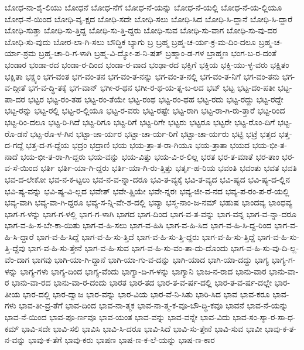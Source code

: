 {ಬೋಧ-ನಾ-ಶೈ-ಲಿಯು
ಬೋಧನೆ
ಬೋಧ-ನೆಗೆ
ಬೋಧ-ನೆ-ಯನ್ನು
ಬೋಧ-ನೆ-ಯಲ್ಲಿ
ಬೋಧ-ನೆ-ಯ-ಲ್ಲಿಯೂ
ಬೋಧ-ನೆ-ಯಿಂದ
ಬೋಧಿ-ವೃ-ಕ್ಷದ
ಬೋಧಿ-ಸದೇ
ಬೋಧಿ-ಸಲು
ಬೋಧಿ-ಸಿದ
ಬೋಧಿ-ಸಿ-ದ್ದಾನೆ
ಬೋಧಿ-ಸಿ-ದ್ದಾರೆ
ಬೋಧಿ-ಸುತ್ತಾ
ಬೋಧಿ-ಸು-ತ್ತಿದ್ದ
ಬೋಧಿ-ಸು-ತ್ತಿ-ದ್ದರು
ಬೋಧಿ-ಸುವ
ಬೋಧಿ-ಸು-ವಾಗ
ಬೋಧಿ-ಸು-ವು-ದರ
ಬೋಧಿ-ಸು-ವುದು
ಬೋರ-ಲಾ-ಗಿ-ಸಲು
ಬೌದ್ಧಿಕ
ಬ್ಯಾಗು
ಬ್ರ
ಬ್ರಹ್ಮ
ಬ್ರಹ್ಮ-ಚ-ರ್ಯ-ಕ್ರ-ಮ-ದಿಂ-ದಲೂ
ಬ್ರಹ್ಮ-ಚ-ರ್ಯಾ-ಶ್ರಮ
ಬ್ರಹ್ಮ-ಚಾ-ರಿ-ಗ-ಳಾಗಿ
ಬ್ರಹ್ಮ-ವಿ-ದ್ಯೋ-ಪ-ನಿ-ಷತ್
ಬ್ರಹ್ಮಾಂ-ಡ-ಗಳ
ಬ್ರಾಹ್ಮಣ
ಭಂಗ-ಬ-ರ-ದಂತೆ
ಭಂಡಾರ
ಭಂಡಾ-ರದ
ಭಂಡಾ-ರ-ದಿಂದ
ಭಂಡಾ-ರ-ವಾದ
ಭಂಢಾ-ರದ
ಭಕ್ತಿಗೆ
ಭಕ್ತಿಯ
ಭಕ್ತಿ-ಯು-ಳ್ಳ-ವರು
ಭಕ್ಷಿತಂ
ಭಕ್ಷಿತಾ
ಭಕ್ಷ್ಯಂ
ಭಗ-ವಂತ
ಭಗ-ವಂ-ತನ
ಭಗ-ವಂ-ತ-ನನ್ನು
ಭಗ-ವಂ-ತ-ನಲ್ಲಿ
ಭಗ-ವಂ-ತ-ನಿಗೆ
ಭಗ-ವಂ-ತನು
ಭಗ-ವ-ದ್ಗೀತೆ
ಭಗ-ವ-ದ್ಧಿ-ತಕ್ಕೆ
ಭಗ-ವಾನ್
ಭಗೀ-ರ-ಥನ
ಭಗೀ-ರ-ಥ-ಯ-ತ್ನ-ಬ-ಲದ
ಭಟ್
ಭಟ್ಟ
ಭಟ್ಟ-ದಂ-ಪತೀ
ಭಟ್ಟ-ಪಾ-ದರ
ಭಟ್ಟರ
ಭಟ್ಟ-ರಂ-ತಹ
ಭಟ್ಟ-ರಂ-ತೆಯೇ
ಭಟ್ಟ-ರಂಥ
ಭಟ್ಟ-ರಂ-ಥಹ
ಭಟ್ಟ-ರದು
ಭಟ್ಟ-ರದ್ದು
ಭಟ್ಟ-ರದ್ದೇ
ಭಟ್ಟ-ರನ್ನು
ಭಟ್ಟ-ರಲ್ಲಿ
ಭಟ್ಟ-ರ-ಲ್ಲಿಯೂ
ಭಟ್ಟ-ರ-ವರು
ಭಟ್ಟ-ರಷ್ಟೇ
ಭಟ್ಟ-ರಾಗಿ
ಭಟ್ಟ-ರಾ-ಗಿ-ರು-ತ್ತಾರೆ
ಭಟ್ಟ-ರಿಂದ
ಭಟ್ಟ-ರಿಂ-ದಲೂ
ಭಟ್ಟ-ರಿ-ಗಿದೆ
ಭಟ್ಟ-ರಿಗೂ
ಭಟ್ಟ-ರಿಗೆ
ಭಟ್ಟ-ರಿಗೇ
ಭಟ್ಟರು
ಭಟ್ಟರೂ
ಭಟ್ಟರೇ
ಭಟ್ಟ-ರೊಂ-ದಿಗೆ
ಭಟ್ಟ-ರೊ-ಡನೆ
ಭಟ್ಟ-ರೊ-ಳ-ಗಿನ
ಭಟ್ಟಾ-ಚಾ-ರ್ಯರ
ಭಟ್ಟಾ-ಚಾ-ರ್ಯ-ರಿಗೆ
ಭಟ್ಟಾ-ಚಾ-ರ್ಯರು
ಭಟ್ಟಿ
ಭಟ್ರೆ
ಭತ್ತದ
ಭತ್ತ-ದ-ಗದ್ದೆ
ಭತ್ತ-ದ-ಗ-ದ್ದೆಯ
ಭದ್ರಂ
ಭದ್ರಾಣಿ
ಭಯ
ಭಯ-ತ್ರಾ-ತ-ರಾ-ಗಿಯೂ
ಭಯ-ತ್ರಾತಾ
ಭಯದ
ಭಯ-ಭೀ-ತ-ನಾದೆ
ಭಯ-ಭೀ-ತ-ರಾ-ಗಿ-ದ್ದರು
ಭಯ-ವನ್ನು
ಭಯ-ವಿತ್ತು
ಭಯ-ವಿ-ರ-ಲಿಲ್ಲ
ಭರತ
ಭರ-ತ-ಮಾತೆ
ಭರ-ತಾಂ
ಭರ-ವ-ಸೆ-ಯಿಂದ
ಭರ್ತಿ
ಭರ್ತಿ-ಯಾ-ಗಿ-ದ್ದರು
ಭರ್ತಿ-ಯಾ-ಗಿ-ರು-ತ್ತಿತ್ತು
ಭರ್ತೃ-ಹ-ರಿಯ
ಭವಂತಿ
ಭವಂತು
ಭವತ
ಭವತಿ
ಭವ-ದ-ಲೇಕೋ
ಭವ-ನ-ಕ-ಟ್ಟಲು
ಭವ-ನ-ವ-ನ್ನಾ-ದರೂ
ಭವಿ-ತ-ವ್ಯಕ್ಕೆ
ಭವಿ-ತ-ವ್ಯದ
ಭವಿ-ಷ್ಯದ
ಭವಿ-ಷ್ಯ-ದ-ಲ್ಲಿನ
ಭವಿ-ಷ್ಯ-ವನ್ನು
ಭವಿ-ಷ್ಯ-ವಿ-ಲ್ಲದ
ಭವೇತ್
ಭವೇ-ತ್ಪ್ರಿಯೇ
ಭವೇ-ನ್ನರಃ
ಭವ್ಯ-ಜೀ-ವ-ನದ
ಭವ್ಯ-ಪ-ರಂ-ಪ-ರೆ-ಯಲ್ಲಿ
ಭವ್ಯ-ವಾಗಿ
ಭವ್ಯ-ವಾ-ಗಿ-ದ್ದರೂ
ಭವ್ಯ-ಸ-ನ್ನಿ-ವೇ-ಶ-ದಲ್ಲಿ
ಭವ್ಯಾ
ಭಸ್ಮ-ನಾಂ-ಜ-ನಮ್
ಭಹುಷ
ಭಾಂದವ್ಯ
ಭಾಂಧವ್ಯ
ಭಾಗ-ಗ-ಳನ್ನು
ಭಾಗ-ಗ-ಳಲ್ಲಿ
ಭಾಗ-ಗ-ಳಾಗಿ
ಭಾಗದ
ಭಾಗ-ದಿಂದ
ಭಾಗ-ವ-ತ-ವನ್ನು
ಭಾಗ-ವನ್ನ
ಭಾಗ-ವ-ನ್ನಾ-ದರೂ
ಭಾಗ-ವ-ಹಿ-ಸ-ಬೇ-ಕಾ-ಯಿತು
ಭಾಗ-ವ-ಹಿ-ಸಲು
ಭಾಗ-ವ-ಹಿಸಿ
ಭಾಗ-ವ-ಹಿ-ಸಿದ
ಭಾಗ-ವ-ಹಿ-ಸಿ-ದ್ದ-ರಿಂದ
ಭಾಗ-ವ-ಹಿ-ಸಿ-ದ್ದಾರೆ
ಭಾಗ-ವ-ಹಿ-ಸಿದ್ದೆ
ಭಾಗ-ವ-ಹಿ-ಸು-ತ್ತಿದೆ
ಭಾಗ-ವ-ಹಿ-ಸು-ತ್ತಿ-ದ್ದರು
ಭಾಗ-ವ-ಹಿ-ಸು-ತ್ತಿದ್ದೆ
ಭಾಗ-ವ-ಹಿ-ಸು-ತ್ತಿ-ದ್ದೆವು
ಭಾಗ-ವ-ಹಿ-ಸು-ತ್ತೇನೆ
ಭಾಗ-ವ-ಹಿ-ಸುವ
ಭಾಗ-ವ-ಹಿ-ಸು-ವಂ-ತಾ-ದು-ದೊಂದು
ಭಾಗ-ವ-ಹಿ-ಸು-ವು-ದಿ-ಲ್ಲ-ವೆಂ-ದಾಗ
ಭಾಗವು
ಭಾಗಿ-ಯಾ-ಗಿ-ದ್ದಾನೆ
ಭಾಗಿ-ಯಾ-ಗು-ವ-ದನ್ನು
ಭಾಗಿ-ಯಾದ
ಭಾಗಿ-ಯಾ-ದದ್ದು
ಭಾಗ್ಯ
ಭಾಗ್ಯ-ಗ-ಳನ್ನು
ಭಾಗ್ಯ-ಗಳು
ಭಾಗ್ಯ-ದಿಂದ
ಭಾಗ್ಯ-ವೆಂದು
ಭಾಗ್ಯಾ-ದಿ-ಗ-ಳನ್ನು
ಭಾಗ್ಯಾನಿ
ಭಾಜ-ನ-ರಾದ
ಭಾನು-ವಾರ
ಭಾನು-ವಾ-ರ				
ಭಾನು-ವಾ-ರದ
ಭಾನು-ವಾ-ರ-ದಂದು
ಭಾರತ
ಭಾರ-ತದ
ಭಾರ-ತ-ವ-ರ್ಷ-ದಲ್ಲಿ
ಭಾರ-ತ-ವ-ರ್ಷ-ದಲ್ಲೇ
ಭಾರ-ತೀಯ
ಭಾರ-ದಲ್ಲಿ
ಭಾರ-ದ್ವಾಜ
ಭಾರ-ವನ್ನು
ಭಾರ-ವಿಯ
ಭಾರ-ವೆ-ನಿ-ಸಿತು
ಭಾರಿ-ಸಿದ
ಭಾವ
ಭಾವ-ಕರೂ
ಭಾವ-ಗಳು
ಭಾವ-ತೀ-ವ್ರ-ತೆಗೆ
ಭಾವ-ದಿಂದ
ಭಾವ-ನಾ-ತ್ಮಕ
ಭಾವ-ನಾ-ತ್ಮ-ಕ-ವೂ-ಬೌ-ದ್ಧಿ-ಕವೂ
ಭಾವನೆ
ಭಾವ-ನೆ-ಯನ್ನು
ಭಾವ-ನೆ-ಯಿಂದ
ಭಾವ-ಪೂ-ರ್ಣವೂ
ಭಾವ-ಯಂತ
ಭಾವ-ವನ್ನು
ಭಾವ-ವನ್ನೇ
ಭಾವ-ವಿದು
ಭಾವ-ಸಂ-ಸ್ಕಾ-ರ-ಸಾ-ಧ-ಕಮ್
ಭಾವಿ-ಸದೇ
ಭಾವಿ-ಸಲಿ
ಭಾವಿಸಿ
ಭಾವಿ-ಸಿ-ದರೂ
ಭಾವಿ-ಸಿದೆ
ಭಾವಿ-ಸು-ತ್ತೇನೆ
ಭಾವಿ-ಸುವ
ಭಾವೀ
ಭಾವು-ಕ-ತ-ನ-ವನ್ನು
ಭಾವು-ಕ-ತೆಗೆ
ಭಾವು-ಕರು
ಭಾಷಣ
ಭಾಷ-ಣ-ಕ-ಲೆ-ಯನ್ನು
ಭಾಷ-ಣ-ಕಾರ
}
